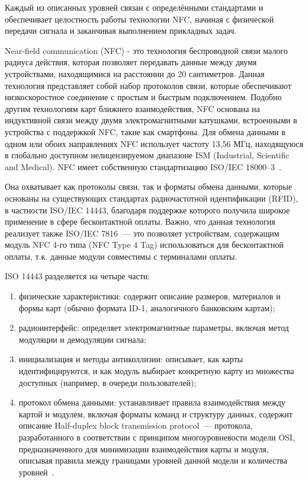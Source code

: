Каждый из описанных уровней связан с определёнными стандартами и обеспечивает целостность работы технологии NFC, начиная с физической передачи сигнала и заканчивая выполнением прикладных задач.

Near-field communication (NFC) - это технология беспроводной связи малого радиуса действия, которая позволяет передавать данные между двумя устройствами, находящимися на расстоянии до 20 сантиметров.
Данная технология представляет собой набор протоколов связи, которые обеспечивают низкоскоростное соединение с простым и быстрым подключением.
Подобно другим технологиям карт ближнего взаимодействия, NFC основана на индуктивной связи между двумя электромагнитными катушками, встроенными в устройства с поддержкой NFC, такие как смартфоны.
Для обмена данными в одном или обоих направлениях NFC использует частоту 13,56 МГц, находящуюся в глобально доступном нелицензируемом диапазоне ISM (Industrial, Scientific and Medical).
NFC имеет собственную стандартизацию ISO/IEC 18000--3~\cite{nfc_wiki}.

Она охватывает как протоколы связи, так и форматы обмена данными, которые основаны на существующих стандартах радиочастотной идентификации (RFID), в частности ISO/IEC 14443, благодаря поддержке которого получила широкое применение в сфере бесконтактной оплаты.
Важно, что данная технология реализует также ISO/IEC 7816~--- это позволяет устройствам, содержащим модуль NFC 4-го типа (NFC Type 4 Tag) использоваться для бесконтактной оплаты, т.к. данные модули совместимы с терминалами оплаты.

ISO 14443 разделяется на четыре части:

\begin{enumerate}
    \item физические характеристики: содержит описание размеров, материалов и формы карт (обычно формата ID-1, аналогичного банковским картам);
    \item радиоинтерфейс: определяет электромагнитные параметры, включая метод модуляции и демодуляции сигнала;
    \item инициализация и методы антиколлизии: описывает, как карты идентифицируются, и как модуль выбирает конкретную карту из множества доступных (например, в очереди пользователей);
    \item протокол обмена данными: устанавливает правила взаимодействия между картой и модулем, включая форматы команд и структуру данных, содержит описание Half-duplex block transmission protocol~--- протокола, разработанного в соответствии с принципом многоуровневости модели OSI, предназначенного для минимизации взаимодействия карты и модуля, описывая правила между границами уровней данной модели и количества уровней~\cite{iso_14443_en}.
\end{enumerate}


